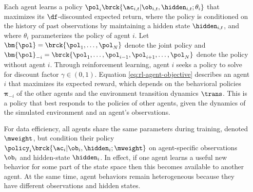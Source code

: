 Each agent learns a policy $\pol_i\brck{\ac_{i,t} | \ob_{i,t}, \hidden_{i,t}; \theta_i}$ that maximizes its $\df$-discounted expected return, where the policy is conditioned on the history of past observations by maintaining a hidden state $\hidden_{i, t}$, and  where
$\theta_i$ parameterizes the policy of agent $i$.
Let $\bm{\pol} = \brck{\pol_1,\ldots,\pol_N}$ denote the joint policy
and $\bm{\pol}_{-i} = \brck{\pol_1,\ldots,\pol_{i-1},\pol_{i+1},\ldots,\pol_N}$ denote the  policy without agent $i$.
Through reinforcement learning, agent $i$ seeks a policy to solve
for discount factor $\gamma \in (0, 1)$. Equation \ref{eq:rl-agent-objective} describes an agent $i$ that maximizes its expected reward, which depends on the behavioral policies $\bm{\pi}_{-i}$ of the other agents and the environment transition dynamics $\trans$.
This is a policy that best responds to the policies of other agents, given the dynamics of the simulated environment and an agent's observations.

For data efficiency, all agents share the same parameters during training,  denoted  $\mweight$, but condition their policy $\policy_i\brck{\ac_i|\ob_i, \hidden_i; \mweight}$ on agent-specific observations $\ob_i$ and  hidden-state $\hidden_i$.
In effect, if one agent learns a useful new behavior for some part of the state space then this becomes available to another agent.
At the same time, agent behaviors remain heterogeneous because they have different observations and hidden states.


